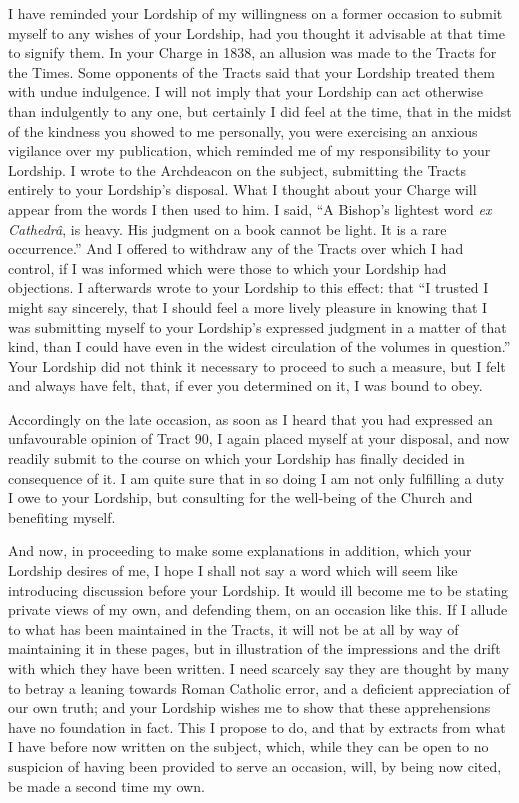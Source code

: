 I have reminded your Lordship of my willingness
on a former occasion to submit myself to any wishes of your Lordship,
had you thought it advisable at that time to signify them. In your
Charge in 1838, an allusion was made to the Tracts for the Times. Some
opponents of the Tracts said that your Lordship treated them with
undue indulgence. I will not imply that your Lordship can act
otherwise than indulgently to any one, but certainly I did feel at the
time, that in the midst of the kindness you showed to me personally,
you were exercising an anxious vigilance over my publication, which
reminded me of my responsibility to your Lordship. I wrote to the
Archdeacon on the subject, submitting the Tracts entirely to your
Lordship's disposal. What I thought about your Charge will appear from
the words I then used to him. I said, ``A Bishop's lightest word \emph{ex
Cathedrâ}, is heavy. His judgment on a book cannot be light. It is
a rare occurrence.'' And I offered to withdraw any of the Tracts over
which I had control, if I was informed which were those to which your
Lordship had objections. I afterwards wrote to your Lordship to this
effect: that ``I trusted I might say sincerely, that I should feel a
more lively pleasure in knowing that I was submitting myself to your
Lordship's expressed judgment in a matter of that kind, than I could
have even in the widest circulation of the volumes in question.'' Your
Lordship did not think it necessary to proceed to such a measure, but
I felt and always have felt, that, if ever you determined on it, I was
bound to obey.

Accordingly on the late occasion, as soon as I
heard that you had expressed an unfavourable opinion of Tract 90, I again placed myself at your disposal, and now readily submit to
the course on which your Lordship has finally decided in consequence
of it. I am quite sure that in so doing I am not only fulfilling a
duty I owe to your Lordship, but consulting for the well-being of the
Church and benefiting myself.

And now, in proceeding to make some explanations
in addition, which your Lordship desires of me, I hope I shall not say
a word which will seem like introducing discussion before your
Lordship. It would ill become me to be stating private views of my
own, and defending them, on an occasion like this. If I allude to what
has been maintained in the Tracts, it will not be at all by way of
maintaining it in these pages, but in illustration of the impressions
and the drift with which they have been written. I need scarcely say
they are thought by many to betray a leaning towards Roman Catholic
error, and a deficient appreciation of our own truth; and your
Lordship wishes me to show that these apprehensions have no foundation
in fact. This I propose to do, and that by extracts from what I have
before now written on the subject, which, while they can be open to no
suspicion of having been provided to serve an occasion, will, by being
now cited, be made a second time my own.

